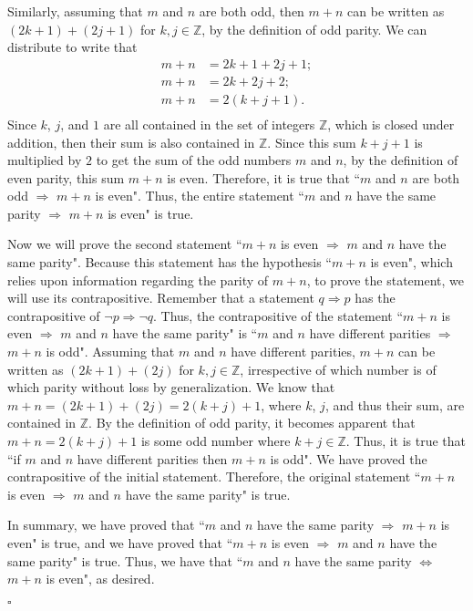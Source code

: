 \documentclass[12pt]{exam}
\begin{document}
\begin{questions}
Similarly, assuming that $m$ and $n$ are both odd, then $m+n$ can be written as $(2k+1)+(2j+1)$ for $k,j \in \mathbb Z$, by the definition of odd parity. We can distribute to write that
\begin{align*}
m+n &= 2k+1+2j+1; \\
m+n &= 2k + 2j+2; \\
m+n &= 2(k+j+1). \\
\end{align*}
Since $k$, $j$, and $1$ are all contained in the set of integers $\mathbb Z$, which is closed under addition, then their sum is also contained in  $\mathbb Z$. Since this sum $k+j+1$ is multiplied by $2$ to get the sum of the odd numbers $m$ and $n$, by the definition of even parity, this sum $m+n$ is even. Therefore, it is true that ``$m$ and $n$ are both odd $\Rightarrow$ $m+n$ is even". Thus, the entire statement ``$m$ and $n$ have the same parity $\Rightarrow$  $m+n$ is even" is true.
\par
Now we will prove the second statement ``$m+n$ is even $\Rightarrow$ $m$ and $n$ have the same parity". Because this statement has the hypothesis ``$m+n$ is even", which relies upon information regarding the parity of $m+n$, to prove the statement, we will use its contrapositive. Remember that a statement $q\Rightarrow p$ has the contrapositive of $\neg p \Rightarrow \neg q$. Thus, the contrapositive of the statement ``$m+n$ is even $\Rightarrow$ $m$ and $n$ have the same parity" is ``$m$ and $n$ have different parities $\Rightarrow$ $m+n$ is odd". Assuming that $m$ and $n$ have different parities, $m+n$ can be written as $(2k+1)+(2j)$ for $k,j \in \mathbb Z$, irrespective of which number is of which parity without loss by generalization. We know that $m+n=(2k+1)+(2j)=2(k+j) + 1$, where $k$, $j$, and thus their sum, are contained in $\mathbb Z$. By the definition of odd parity, it becomes apparent that $m+n = 2(k+j) + 1$ is some odd number where $k+j \in \mathbb Z$. Thus, it is true that ``if $m$ and $n$ have different parities then $m+n$ is odd". We have proved the contrapositive of the initial statement. Therefore, the original statement ``$m+n$ is even $\Rightarrow$ $m$ and $n$ have the same parity" is true.
\par
In summary, we have proved that ``$m$ and $n$ have the same parity $\Rightarrow$  $m+n$ is even" is true, and we have proved that ``$m+n$ is even $\Rightarrow$ $m$ and $n$ have the same parity" is true. Thus, we have that ``$m$ and $n$ have the same parity $\Leftrightarrow$  $m+n$ is even", as desired.
\begin{flushright}
$\square$
\end{flushright}


\end{questions}
\end{document}
